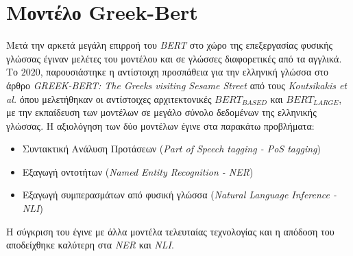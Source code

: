 \section{Μοντέλο Greek-Bert}
Μετά την αρκετά μεγάλη επιρροή του \emph{BERT} στο χώρο της επεξεργασίας φυσικής γλώσσας έγιναν μελέτες του μοντέλου και σε γλώσσες διαφορετικές από τα αγγλικά. Το $2020$, παρουσιάστηκε η αντίστοιχη προσπάθεια για την ελληνική γλώσσα στο άρθρο \emph{GREEK-BERT: The Greeks visiting Sesame Street} \cite{greek-bert} από τους \emph{Koutsikakis et al.} όπου μελετήθηκαν οι αντίστοιχες αρχιτεκτονικές $BERT_{BASED}$ και $BERT_{LARGE}$, με την εκπαίδευση των μοντέλων σε μεγάλο σύνολο δεδομένων της ελληνικής γλώσσας. Η αξιολόγηση των δύο μοντέλων έγινε στα παρακάτω προβλήματα:
\begin{itemize}
    \item Συντακτική Ανάλυση Προτάσεων (\emph{Part of Speech tagging - PoS tagging})
    \item Εξαγωγή οντοτήτων (\emph{Named Entity Recognition - NER})
    \item Εξαγωγή συμπερασμάτων από φυσική γλώσσα (\emph{Natural Language Inference - NLI})
\end{itemize}

Η σύγκριση του έγινε με άλλα μοντέλα τελευταίας τεχνολογίας και η απόδοση του αποδείχθηκε καλύτερη στα \emph{NER} και \emph{NLI}.